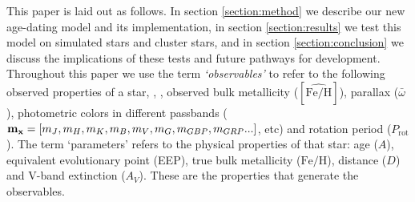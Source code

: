 This paper is laid out as follows.
In section \ref{section:method} we describe our new age-dating model and its
implementation, in section \ref{section:results} we test this model on
simulated stars and cluster stars, and in section \ref{section:conclusion} we
discuss the implications of these tests and future pathways for development.
Throughout this paper we use the term {\it `observables'} to refer to the
following observed properties of a star, \teff, \logg, observed bulk
metallicity ($[\hat{\mathrm{Fe/H}}]$), parallax ($\bar{\omega}$), photometric
colors in different passbands (${\bf m_x} = [m_J, m_H, m_K, m_B, m_V, m_G,
m_{GBP}, m_{GRP}...]$, etc) and rotation period ($P_{\mathrm{rot}}$).
The term `parameters' refers to the physical properties of that star: age
($A$), equivalent evolutionary point (EEP), true bulk metallicity
($\mathrm{Fe/H}$), distance ($D$) and V-band extinction ($A_V$).
These are the properties that generate the observables.
